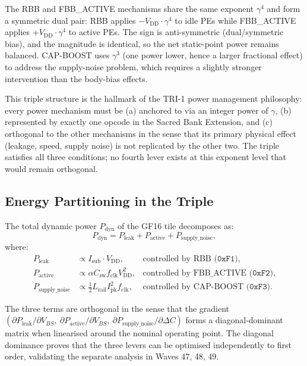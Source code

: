 \documentclass[12pt,a4paper]{report}
\theoremstyle{plain}
\theoremstyle{definition}
\theoremstyle{remark}
\newcommand{\Vdd}{V_{\mathrm{DD}}}
\newcommand{\Lrail}{L_{\mathrm{rail}}}
\newcommand{\deltaC}{\Delta C}
\newcommand{\Bseven}{\mathrm{B007}}
\begin{document}
The RBB and FBB\_ACTIVE mechanisms share the same exponent $\gamma^{4}$
and form a symmetric dual pair: RBB applies $-\Vdd\cdot\gamma^{4}$ to
idle PEs while FBB\_ACTIVE applies $+\Vdd\cdot\gamma^{4}$ to active PEs.
The sign is anti-symmetric (dual/symmetric bias), and the magnitude is
identical, so the net static-point power remains balanced.
CAP-BOOST uses $\gamma^{3}$ (one power lower, hence a larger fractional
effect) to address the supply-noise problem, which requires a slightly
stronger intervention than the body-bias effects.

This triple structure is the hallmark of the TRI-1 power management
philosophy: every power mechanism must be (a) anchored to \Bseven{}
via an integer power of $\gamma$, (b) represented by exactly one opcode
in the Sacred Bank Extension, and (c) orthogonal to the other mechanisms
in the sense that its primary physical effect (leakage, speed, supply noise)
is not replicated by the other two.
The triple satisfies all three conditions; no fourth lever exists at this
exponent level that would remain orthogonal.

\subsection{Energy Partitioning in the Triple}
\label{ssec:energy-partitioning}

The total dynamic power $P_{\mathrm{dyn}}$ of the GF16 tile decomposes as:
\[
  P_{\mathrm{dyn}} = P_{\mathrm{leak}} + P_{\mathrm{active}} + P_{\mathrm{supply\_noise}},
\]
where:
\begin{align}
  P_{\mathrm{leak}} &\propto I_{\mathrm{sub}} \cdot \Vdd,
    & \text{controlled by RBB ($\texttt{0xF1}$)},\\
  P_{\mathrm{active}} &\propto \alpha C_{\mathrm{sw}} f_{\mathrm{clk}} \Vdd^{2},
    & \text{controlled by FBB\_ACTIVE ($\texttt{0xF2}$)},\\
  P_{\mathrm{supply\_noise}} &\propto \frac{1}{2}\Lrail I_{\mathrm{pk}}^{2} f_{\mathrm{clk}},
    & \text{controlled by CAP-BOOST ($\texttt{0xF3}$)}.
\end{align}

The three terms are orthogonal in the sense that the gradient
$(\partial P_{\mathrm{leak}}/\partial V_{BS},\
  \partial P_{\mathrm{active}}/\partial V_{BS},\
  \partial P_{\mathrm{supply\_noise}}/\partial \deltaC)$
forms a diagonal-dominant matrix when linearised around the nominal operating point.
The diagonal dominance proves that the three levers can be optimised
independently to first order, validating the separate analysis in Waves 47, 48, 49.
\end{document}

